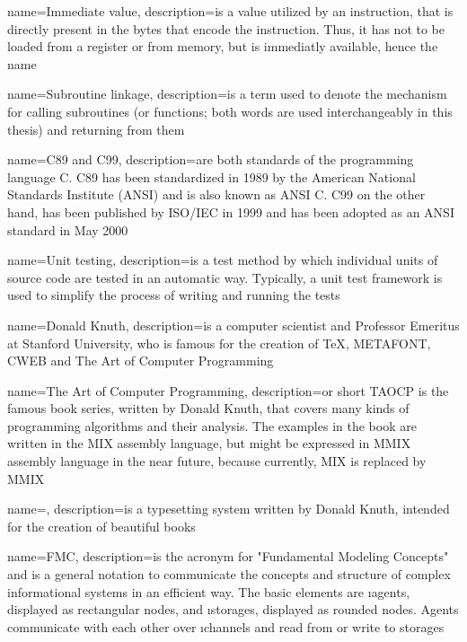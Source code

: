 {
	name={Immediate value},
	description={is a value utilized by an instruction, that is directly present in the bytes that encode the instruction. Thus, it has not to be loaded from a register or from memory, but is immediatly available, hence the name}
}

{
	name={Subroutine linkage},
	description={is a term used to denote the mechanism for calling subroutines (or functions; both words are used interchangeably in this thesis) and returning from them}
}

{
	name={C89 and C99},
	description={are both standards of the programming language C. C89 has been standardized in 1989 by the American National Standards Institute (ANSI) and is also known as ANSI C. \citep{glc89} C99 on the other hand, has been published by ISO/IEC in 1999 and has been adopted as an ANSI standard in May 2000 \citep{glc99}}
}

{
	name={Unit testing},
	description={is a test method by which individual units of source code are tested in an automatic way. \citep{glunit} Typically, a unit test framework is used to simplify the process of writing and running the tests}
}

{
	name={Donald Knuth},
	description={is a computer scientist and Professor Emeritus at Stanford University, who is famous for the creation of \gls{TeX}, METAFONT, CWEB and \gls{The Art of Computer Programming} \citep{gldonknuth}}
}

{
	name={The Art of Computer Programming},
	description={or short TAOCP is the famous book series, written by \gls{Donald Knuth}, that covers many kinds of programming algorithms and their analysis. The examples in the book are written in the MIX assembly language, but might be expressed in MMIX assembly language in the near future, because currently, MIX is replaced by MMIX \citep{gltaocp}}
}

{
	name={\protect{\TeX}},
	description={is a typesetting system written by \gls{Donald Knuth}, intended for the creation of beautiful books \citep{gltex}}
}

{
	name={FMC},
	description={is the acronym for "Fundamental Modeling Concepts" and is a general notation to communicate the concepts and structure of complex informational systems in an efficient way. The basic elements are \i{agents}, displayed as rectangular nodes, and \i{storages}, displayed as rounded nodes. Agents communicate with each other over \i{channels} and read from or write to storages \citep{glfmc}}
}


